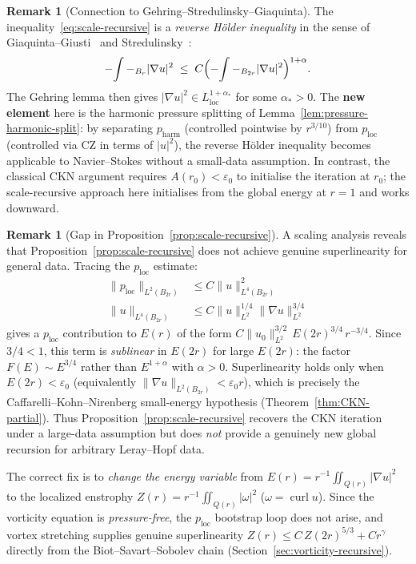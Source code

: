 \documentclass[11pt]{article}
\theoremstyle{definition}
\newtheorem{remark}[theorem]{Remark}
\theoremstyle{remark}
\newcommand{\Xint}{\mathop{\mathchoice{\vcenter{\hbox{$\displaystyle-$}}}%
  {\vcenter{\hbox{$\textstyle-$}}}%
  {\vcenter{\hbox{$\scriptstyle-$}}}%
  {\vcenter{\hbox{$\scriptscriptstyle-$}}}}\!\int}
\begin{document}
\begin{remark}[Connection to Gehring--Stredulinsky--Giaquinta]\label{rem:gehring-connection}
  The inequality~\eqref{eq:scale-recursive} is a \emph{reverse H\"{o}lder
  inequality} in the sense of Giaquinta--Giusti~\cite{Giaquinta1982} and
  Stredulinsky~\cite{Stredulinsky1984}:
  \[
    \Xint-_{B_r}|\nabla u|^2 \;\leq\; C\Bigl(\Xint-_{B_{2r}}|\nabla u|^2\Bigr)^{1+\alpha}.
  \]
  The Gehring lemma then gives $|\nabla u|^2\in L^{1+\alpha_*}_{\mathrm{loc}}$
  for some $\alpha_* > 0$.  The \textbf{new element} here is the harmonic
  pressure splitting of Lemma~\ref{lem:pressure-harmonic-split}: by separating
  $p_{\mathrm{harm}}$ (controlled pointwise by $r^{3/10}$) from
  $p_{\mathrm{loc}}$ (controlled via CZ in terms of $|u|^2$), the reverse
  H\"{o}lder inequality becomes applicable to Navier--Stokes without a
  small-data assumption.  In contrast, the classical CKN argument requires
  $A(r_0)<\varepsilon_0$ to initialise the iteration at $r_0$; the
  scale-recursive approach here initialises from the global energy at $r=1$
  and works downward.
\end{remark}

\begin{remark}[Gap in Proposition~\ref{prop:scale-recursive}]\label{rem:prop19-gap}
  A scaling analysis reveals that Proposition~\ref{prop:scale-recursive}
  does not achieve genuine superlinearity for general data.
  Tracing the $p_{\mathrm{loc}}$ estimate:
  \begin{align*}
    \|p_{\mathrm{loc}}\|_{L^2(B_{2r})} &\leq C\|u\|_{L^4(B_{2r})}^2
    \tag{CZ} \\
    \|u\|_{L^4(B_{2r})} &\leq C\|u\|_{L^2}^{1/4}\|\nabla u\|_{L^2}^{3/4}
    \tag{GN, 3D}
  \end{align*}
  gives a $p_{\mathrm{loc}}$ contribution to $E(r)$ of the form
  $C\|u_0\|_{L^2}^{3/2}\,E(2r)^{3/4}\,r^{-3/4}$.
  Since $3/4 < 1$, this term is \emph{sublinear} in $E(2r)$ for large $E(2r)$:
  the factor $F(E) \sim E^{3/4}$ rather than $E^{1+\alpha}$ with $\alpha>0$.
  Superlinearity holds only when $E(2r) < \varepsilon_0$ (equivalently
  $\|\nabla u\|_{L^2(B_{2r})} < \varepsilon_0 r$), which is precisely the
  Caffarelli--Kohn--Nirenberg small-energy hypothesis
  (Theorem~\ref{thm:CKN-partial}).
  Thus Proposition~\ref{prop:scale-recursive} recovers the CKN iteration
  under a large-data assumption but does \emph{not} provide a genuinely
  new global recursion for arbitrary Leray--Hopf data.

  The correct fix is to \emph{change the energy variable} from
  $E(r)=r^{-1}\iint_{Q(r)}|\nabla u|^2$ to the localized enstrophy
  $Z(r)=r^{-1}\iint_{Q(r)}|\omega|^2$ ($\omega=\operatorname{curl} u$).
  Since the vorticity equation is \emph{pressure-free}, the $p_{\mathrm{loc}}$
  bootstrap loop does not arise, and vortex stretching supplies
  genuine superlinearity $Z(r)\leq C\,Z(2r)^{5/3}+Cr^\gamma$
  directly from the Biot--Savart--Sobolev chain (Section~\ref{sec:vorticity-recursive}).
\end{remark}
\end{document}
